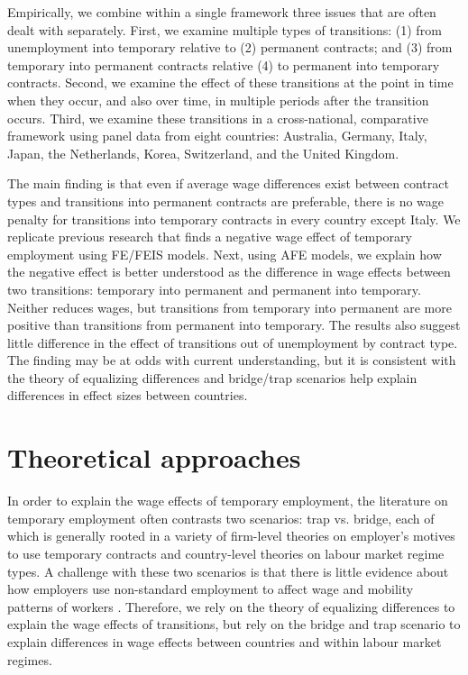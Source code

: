\documentclass[12pt]{article}
\begin{document}
Empirically, we combine within a single framework three issues that are often dealt with separately.  First, we examine multiple types of transitions: (1) from unemployment into temporary relative to (2) permanent contracts; and (3) from temporary into permanent contracts relative (4) to permanent into temporary contracts.  Second, we examine the effect of these transitions at the point in time when they occur, and also over time, in multiple periods after the transition occurs.  Third, we examine these transitions in a cross-national, comparative framework using panel data from eight countries: Australia, Germany, Italy, Japan, the Netherlands, Korea, Switzerland, and the United Kingdom.  

The main finding is that even if average wage differences exist between contract types and transitions into permanent contracts are preferable, there is no wage penalty for transitions into temporary contracts in every country except Italy.  We replicate previous research that finds a negative wage effect of temporary employment using FE/FEIS models.  Next, using AFE models, we explain how the negative effect is better understood as the difference in wage effects between two transitions: temporary into permanent and permanent into temporary.  Neither reduces wages, but transitions from temporary into permanent are more positive than transitions from permanent into temporary.  The results also suggest little difference in the effect of transitions out of unemployment by contract type.  The finding may be at odds with current understanding, but it is consistent with the theory of equalizing differences and bridge/trap scenarios help explain differences in effect sizes between countries.  


\section{Theoretical approaches}

In order to explain the wage effects of temporary employment, the literature on temporary employment often contrasts two scenarios: trap vs. bridge, each of which is generally rooted in a variety of firm-level theories on employer's motives to use temporary contracts and country-level theories on labour market regime types.  A challenge with these two scenarios is that there is little evidence about how employers use non-standard employment to affect wage and mobility patterns of workers \citep{mattijssen_scarred_2022,bills_demand_2017}.  Therefore, we rely on the theory of equalizing differences to explain the wage effects of transitions, but rely on the bridge and trap scenario to explain differences in wage effects between countries and within labour market regimes.
\end{document}
